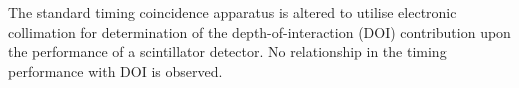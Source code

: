 The standard timing coincidence apparatus is altered to utilise electronic collimation for determination of the depth-of-interaction (DOI) contribution upon the performance of a scintillator detector. No relationship in the timing performance with DOI is observed.